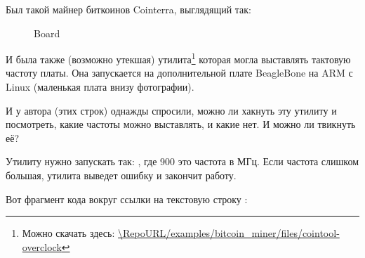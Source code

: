 
Был такой майнер биткоинов Cointerra, выглядящий так:

\begin{figure}[H]
\centering
{}
\caption{Board}
\end{figure}

И была также (возможно утекшая) утилита\footnote{Можно скачать здесь: \url{\RepoURL/examples/bitcoin_miner/files/cointool-overclock}}
которая могла выставлять тактовую частоту платы.
Она запускается на дополнительной плате BeagleBone на ARM с Linux (маленькая плата внизу фотографии).

И у автора (этих строк) однажды спросили, можно ли хакнуть эту утилиту и посмотреть, какие частоты можно выставлять, и какие нет.
И можно ли твикнуть её?

Утилиту нужно запускать так: , где 900 это частота в МГц.
Если частота слишком большая, утилита выведет ошибку  и закончит работу.

Вот фрагмент кода вокруг ссылки на текстовую строку :

